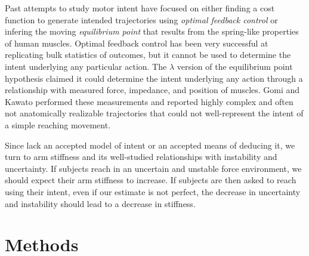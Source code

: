 \documentclass[letterpaper, 10 pt, conference]{ieeeconf}  %
\begin{document}
Past attempts to study motor intent have focused on either finding a cost function to generate intended trajectories using \textit{optimal feedback control} or infering the moving \textit{equilibrium point} that results from the spring-like properties of human muscles. Optimal feedback control has been very successful at replicating bulk statistics of outcomes, but it cannot be used to determine the intent underlying any particular action. The $\lambda$ version of the equilibrium point hypothesis claimed it could determine the intent underlying any action through a relationship with measured force, impedance, and position of muscles. Gomi and Kawato\cite{gomi1997human} performed these measurements and reported highly complex and often not anatomically realizable trajectories that could not well-represent the intent of a simple reaching movement.

Since lack an accepted model of intent or an accepted means of deducing it, we turn to arm stiffness and its well-studied relationships with instability and uncertainty. If subjects reach in an uncertain and unstable force environment, we should expect their arm stiffness to increase. If subjects are then asked to reach using their intent, even if our estimate is not perfect, the decrease in uncertainty and instability should lead to a decrease in stiffness.

\section{Methods}
\end{document}
